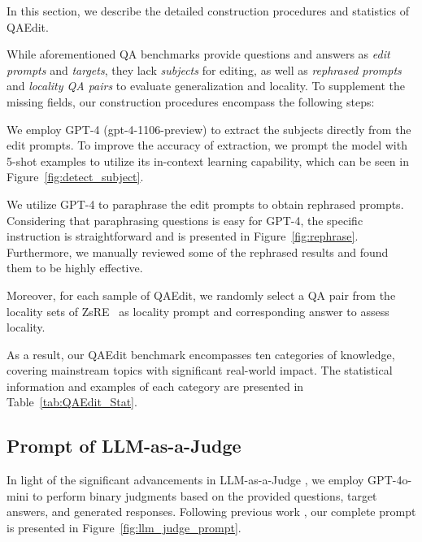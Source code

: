 

In this section, we describe the detailed construction procedures and statistics of QAEdit.

While aforementioned QA benchmarks provide questions and answers as \textit{edit prompts} and \textit{targets}, they lack \textit{subjects} for editing, as well as \textit{rephrased prompts} and \textit{locality QA pairs} to evaluate generalization and locality.
To supplement the missing fields, our construction procedures encompass the following steps:
\begin{enumerate*}[label=\roman*)]
    \item We employ GPT-4 (gpt-4-1106-preview) to extract the subjects directly from the edit prompts. 
    To improve the accuracy of extraction, we prompt the model with 5-shot examples to utilize its in-context learning capability, which can be seen in Figure~\ref{fig:detect_subject}.
    \item We utilize GPT-4 to paraphrase the edit prompts to obtain rephrased prompts. 
    Considering that paraphrasing questions is easy for GPT-4, the specific instruction is straightforward and is presented in Figure~\ref{fig:rephrase}. 
    Furthermore, we manually reviewed some of the rephrased results and found them to be highly effective.
    \item Moreover, for each sample of QAEdit, we randomly select a QA pair from the locality sets of ZsRE~\cite{levy2017zero} as locality prompt and corresponding answer to assess locality.
\end{enumerate*}

As a result, our QAEdit benchmark encompasses ten categories of knowledge, covering mainstream topics with significant real-world impact.
The statistical information and examples of each category are presented in Table~\ref{tab:QAEdit_Stat}.





\subsection{Prompt of LLM-as-a-Judge}
\label{apd:judge_prompt}

In light of the significant advancements in LLM-as-a-Judge \cite{li2024llmasjudge}, we employ GPT-4o-mini to perform binary judgments based on the provided questions, target answers, and generated responses. 
Following previous work \cite{wei2024measuringshortformfactualitylarge}, our complete prompt is presented in Figure~\ref{fig:llm_judge_prompt}.




